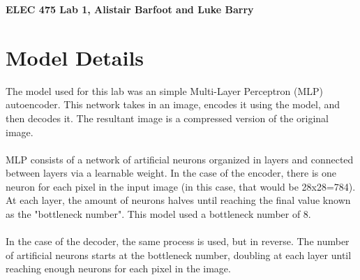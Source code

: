 \documentclass[letterpaper,11pt,twoside]{article}
\begin{document}
\begin{center}
    \LARGE
    \textbf{ELEC 475 Lab 1, Alistair Barfoot and Luke Barry}\\[12pt]
    \normalsize
\end{center}

\section{Model Details}
The model used for this lab was an simple Multi-Layer Perceptron (MLP) autoencoder. This network takes in an image, encodes it using the model, and then decodes it. The resultant image is a compressed version of the original image.
\\
\\
MLP consists of a network of artificial neurons organized in layers and connected between layers via a learnable weight. In the case of the encoder, there is one neuron for each pixel in the input image (in this case, that would be 28x28=784). At each layer, the amount of neurons halves until reaching the final value known as the "bottleneck number". This model used a bottleneck number of 8.
\\
\\
In the case of the decoder, the same process is used, but in reverse. The number of artificial neurons starts at the bottleneck number, doubling at each layer until reaching enough neurons for each pixel in the image.
\end{document}
